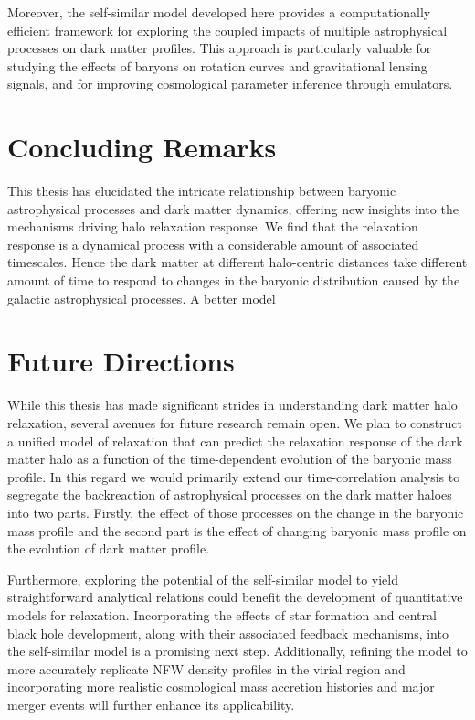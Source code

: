 Moreover, the self-similar model developed here provides a computationally efficient framework for exploring the coupled impacts of multiple astrophysical processes on dark matter profiles. This approach is particularly valuable for studying the effects of baryons on rotation curves and gravitational lensing signals, and for improving cosmological parameter inference through emulators.



\section{Concluding Remarks}
This thesis has elucidated the intricate relationship between baryonic astrophysical processes and dark matter dynamics, offering new insights into the mechanisms driving halo relaxation response. We find that the relaxation response is a dynamical process with a considerable amount of associated timescales. Hence the dark matter at different halo-centric distances take different amount of time to respond to changes in the baryonic distribution caused by the galactic astrophysical processes. A better model 

\section{Future Directions}
While this thesis has made significant strides in understanding dark matter halo relaxation, several avenues for future research remain open. We plan to construct a unified model of relaxation that can predict the relaxation response of the dark matter halo as a function of the time-dependent evolution of the baryonic mass profile. In this regard we would primarily extend our time-correlation analysis to segregate the backreaction of astrophysical processes on the dark matter haloes into two parts. Firstly, the effect of those processes on the change in the baryonic mass profile and the second part is the effect of changing baryonic mass profile on the evolution of dark matter profile.


Furthermore, exploring the potential of the self-similar model to yield straightforward analytical relations could benefit the development of quantitative models for relaxation. Incorporating the effects of star formation and central black hole development, along with their associated feedback mechanisms, into the self-similar model is a promising next step. Additionally, refining the model to more accurately replicate NFW density profiles in the virial region and incorporating more realistic cosmological mass accretion histories and major merger events will further enhance its applicability.
